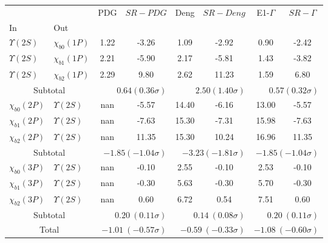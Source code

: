 \begin{tabular}{|l|l|c|c|c|c|c|c|}%
\hline%
&&PDG&$SR-PDG$&Deng&$SR-Deng$&E1-$\Gamma$&$SR-\Gamma$\\%
In&Out&&&&&&\\%
\hline%
$\Upsilon(2S)$&$\chi_{b0}(1P)$&1.22&-3.26&1.09&-2.92&0.90&-2.42\\%
$\Upsilon(2S)$&$\chi_{b1}(1P)$&2.21&-5.90&2.17&-5.81&1.43&-3.82\\%
$\Upsilon(2S)$&$\chi_{b2}(1P)$&2.29&9.80&2.62&11.23&1.59&6.80\\%
\hline%
\hline%
\multicolumn{2}{|c|}{Subtotal}&\multicolumn{2}{|r|}{$0.64 (0.36\sigma)$}&\multicolumn{2}{|r|}{$2.50 (1.40\sigma)$}&\multicolumn{2}{|r|}{$0.57 (0.32\sigma)$}\\%
\hline%
\hline%
$\chi_{b0}(2P)$&$\Upsilon(2S)$&nan&-5.57&14.40&-6.16&13.00&-5.57\\%
$\chi_{b1}(2P)$&$\Upsilon(2S)$&nan&-7.63&15.30&-7.31&15.98&-7.63\\%
$\chi_{b2}(2P)$&$\Upsilon(2S)$&nan&11.35&15.30&10.24&16.96&11.35\\%
\hline%
\hline%
\multicolumn{2}{|c|}{Subtotal}&\multicolumn{2}{|r|}{$-1.85 (-1.04\sigma)$}&\multicolumn{2}{|r|}{$-3.23 (-1.81\sigma)$}&\multicolumn{2}{|r|}{$-1.85 (-1.04\sigma)$}\\%
\hline%
\hline%
$\chi_{b0}(3P)$&$\Upsilon(2S)$&nan&-0.10&2.55&-0.10&2.53&-0.10\\%
$\chi_{b1}(3P)$&$\Upsilon(2S)$&nan&-0.30&5.63&-0.30&5.70&-0.30\\%
$\chi_{b2}(3P)$&$\Upsilon(2S)$&nan&0.60&6.72&0.54&7.51&0.60\\%
\hline%
\hline%
\multicolumn{2}{|c|}{Subtotal}&\multicolumn{2}{|r|}{$0.20~(0.11\sigma)$}&\multicolumn{2}{|r|}{$0.14~(0.08\sigma)$}&\multicolumn{2}{|r|}{$0.20~(0.11\sigma)$}\\%
\hline%
\hline%
\multicolumn{2}{|c|}{Total}&\multicolumn{2}{|r|}{$-1.01~(-0.57\sigma)$}&\multicolumn{2}{|r|}{$-0.59~(-0.33\sigma)$}&\multicolumn{2}{|r|}{$-1.08~(-0.60\sigma)$}\\%
\hline%
\end{tabular}